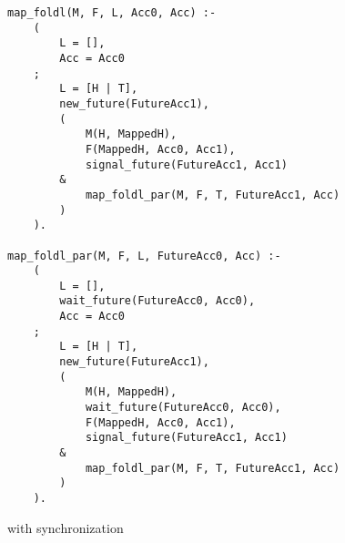 \begin{figure}[tb]
\begin{verbatim}
map_foldl(M, F, L, Acc0, Acc) :-
    (
        L = [],
        Acc = Acc0
    ;
        L = [H | T],
        new_future(FutureAcc1),
        (
            M(H, MappedH),
            F(MappedH, Acc0, Acc1),
            signal_future(FutureAcc1, Acc1)
        &
            map_foldl_par(M, F, T, FutureAcc1, Acc)
        )
    ).

map_foldl_par(M, F, L, FutureAcc0, Acc) :-
    (
        L = [],
        wait_future(FutureAcc0, Acc0),
        Acc = Acc0
    ;
        L = [H | T],
        new_future(FutureAcc1),
        (
            M(H, MappedH),
            wait_future(FutureAcc0, Acc0),
            F(MappedH, Acc0, Acc1),
            signal_future(FutureAcc1, Acc1)
        &
            map_foldl_par(M, F, T, FutureAcc1, Acc)
        )
    ).
\end{verbatim}
\caption{\mapfoldl{} with synchronization}
\label{fig:map_foldl_sync}
\end{figure}


